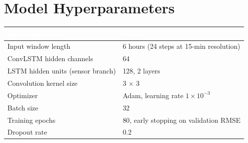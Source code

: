 \chapter{Model Hyperparameters}

\begin{center}
\renewcommand{\arraystretch}{1.3}
\begin{tabularx}{\textwidth}{@{}l X@{}}
\toprule
\rowcolor{chulapink}
\textcolor{white}{\textbf{Hyperparameter}} & \textcolor{white}{\textbf{Value}} \\
\midrule
Input window length & 6 hours (24 steps at 15-min resolution) \\
ConvLSTM hidden channels & 64 \\
LSTM hidden units (sensor branch) & 128, 2 layers \\
Convolution kernel size & 3 $\times$ 3 \\
Optimizer & Adam, learning rate $1\times10^{-3}$ \\
Batch size & 32 \\
Training epochs & 80, early stopping on validation RMSE \\
Dropout rate & 0.2 \\
\bottomrule
\end{tabularx}
\end{center}
